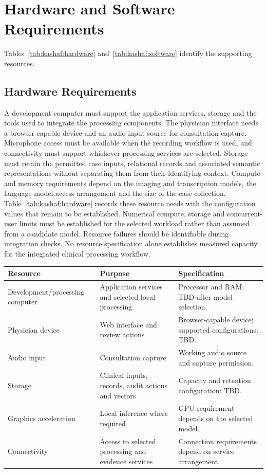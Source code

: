 \section{Hardware and Software Requirements}

Tables~\ref{tab:kashaf:hardware} and~\ref{tab:kashaf:software} identify the supporting resources.

\subsection{Hardware Requirements}

A development computer must support the application services, storage and the tools used to integrate the processing components. The physician interface needs a browser-capable device and an audio input source for consultation capture. Microphone access must be available when the recording workflow is used, and connectivity must support whichever processing services are selected. Storage must retain the permitted case inputs, relational records and associated semantic representations without separating them from their identifying context. Compute and memory requirements depend on the imaging and transcription models, the language-model access arrangement and the size of the case collection. Table~\ref{tab:kashaf:hardware} records these resource needs with the configuration values that remain to be established. Numerical compute, storage and concurrent-user limits must be established for the selected workload rather than assumed from a candidate model. Resource failures should be identifiable during integration checks. No resource specification alone establishes measured capacity for the integrated clinical processing workflow.

\begin{reporttable}
\centering
\small
\caption{Hardware resources supporting the Zeest workflow.}
\label{tab:kashaf:hardware}
\begin{tabular}{|p{}|p{}|p{}|}
\hline
Resource & Purpose & Specification \\ \hline
Development/processing computer & Application services and selected local processing & Processor and RAM: TBD after model selection. \\ \hline
Physician device & Web interface and review actions & Browser-capable device; supported configurations: TBD. \\ \hline
Audio input & Consultation capture & Working audio source and capture permission. \\ \hline
Storage & Clinical inputs, records, audit actions and vectors & Capacity and retention configuration: TBD. \\ \hline
Graphics acceleration & Local inference where required & GPU requirement depends on the selected model. \\ \hline
Connectivity & Access to selected processing and evidence services & Connection requirements depend on service arrangement. \\ \hline
\end{tabular}
\end{reporttable}

